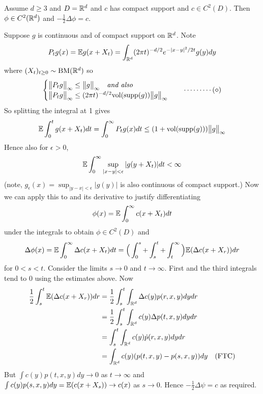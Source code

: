 \documentclass[12pt,a4paper]{report}
\newenvironment{proof}
{\begin{changemargin}{1cm}{0.5cm} 
	}%
	{\end{changemargin}
}
\begin{document}
 Assume $d\geq 3$ and $D= \mathbb{R}^d$ and $c$ has compact support and $c\in C^2(D)$. Then $\phi \in C^2(\mathbb{R}^d)$ and $-\frac{1}{2} \Delta \phi =c$.
\begin{proof}
\pf Suppose $g$ is continuous and of compact support on $\mathbb{R}^d$. Note
\begin{align*}
P_t g(x) = \mathbb{E} g(x+X_t) = \int_{\mathbb{R}^d} (2\pi t)^{-d/2} e^{-|x-y|^2/2t} g(y) dy
\end{align*}
where $(X_t)_{t\geq 0} \sim \text{BM}(\mathbb{R}^d)$ so 
\begin{align*}
\begin{cases}
\bigl\lVert P_t g\bigr\rVert_{\infty}  \leq \bigl\lVert g\bigr\rVert_{\infty} \quad \text{\emph{and also}} \\
\bigl\lVert P_t g\bigr\rVert_{\infty} \leq (2\pi t)^{-d/2} \text{vol}(\text{supp}(g)) \bigl\lVert g\bigr\rVert_{\infty}
\end{cases} \quad \cdots \cdots\cdots (\diamond)
\end{align*}
So splitting the integral at 1 gives
\begin{align*}
\mathbb{E} \int_0^t g(x+X_t) dt = \int_0^{\infty} P_t g(x) dt \leq (1+ \text{vol}(\text{supp}(g))) \bigl\lVert g\bigr\rVert_{\infty}
\end{align*}
Hence also for $\epsilon >0$,
\begin{align*}
\mathbb{E} \int_0^{\infty} \sup_{|x-y|< \epsilon} |g(y+X_t)| dt < \infty
\end{align*}
(note, $g_{\epsilon}(x) = \sup_{|y-x| < \epsilon } |g(y)|$ is also continuous of compact support.) Now we can apply this to and its derivative to justify differentiating
\begin{align*}
\phi(x) = \mathbb{E} \int_0^{\infty} c(x+X_t) dt
\end{align*}
under the integrals to obtain $\phi \in C^2(D)$ and 
\begin{align*}
\Delta  \phi(x) = \mathbb{E} \int_0^{\infty} \Delta c(x+X_t) dt = \Big( \int_0^s + \int_s^t + \int_t^{\infty} \Big) \mathbb{E}(\Delta c(x+X_r)) dr
\end{align*} 
for $0<s<t$. Consider the limits $s\rightarrow 0$ and $t\rightarrow \infty$. First and the third integrals tend to 0 using the estimates above. Now
\begin{align*}
\frac{1}{2} \int_s^t  \mathbb{E}(\Delta c(x+X_r)) dr &= \frac{1}{2} \int_s^t \int_{\mathbb{R}^d} \Delta c(y) p(r,x,y) dydr \\
&= \frac{1}{2} \int_s^t \int_{\mathbb{R}^d} c(y) \Delta p(t,x,y) dy dr \\
& = \int_s^t \int_{\mathbb{R}^d} c(y) \dot{p} (r,x,y) dydr \\
&= \int_{\mathbb{R}^d} c(y) (p(t,x,y)-p(s,x,y)) dy \quad (\text{FTC})
\end{align*}
But $\int c(y) p(t,x,y) dy \rightarrow 0$ as $t\rightarrow \infty$ and $\int c(y)p(s,x,y) dy = \mathbb{E} (c(x+X_s)) \rightarrow c(x)$ as $s\rightarrow 0$. Hence $-\frac{1}{2} \Delta \psi =c$ as required.

\eop 
\end{proof}
\s
\end{document}
